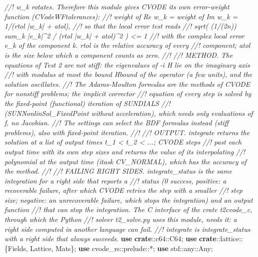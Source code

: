 \documentclass[
  10pt,
]{article}
\newenvironment{Shaded}{}{}
\newcommand{\BuiltInTok}[1]{\textcolor[rgb]{0.00,0.50,0.00}{#1}}
\newcommand{\CommentTok}[1]{\textcolor[rgb]{0.38,0.63,0.69}{\textit{#1}}}
\newcommand{\KeywordTok}[1]{\textcolor[rgb]{0.00,0.44,0.13}{\textbf{#1}}}
\newcommand{\NormalTok}[1]{#1}
\newcommand{\OperatorTok}[1]{\textcolor[rgb]{0.40,0.40,0.40}{#1}}
\newcommand{\PreprocessorTok}[1]{\textcolor[rgb]{0.74,0.48,0.00}{#1}}
\begin{document}
\begin{Shaded}
\begin{Highlighting}[]
\CommentTok{//! w\_k rotates.  Therefore this module gives CVODE its own error{-}weight function (CVodeWFtolerances):}
\CommentTok{//!     weight of Re w\_k = weight of Im w\_k = 1/(rtol |w\_k| + atol),}
\CommentTok{//! so that the local error test reads}
\CommentTok{//!     sqrt( (1/(2n)) sum\_k |e\_k|\^{}2 / (rtol |w\_k| + atol)\^{}2 ) \textless{}= 1}
\CommentTok{//! with the complex local error e\_k of the component k.  rtol is the relative accuracy of every}
\CommentTok{//! component; atol is the size below which a component counts as zero.}
\CommentTok{//!}
\CommentTok{//! METHOD.  The equations of Test 2 are not stiff: the eigenvalues of {-}i H lie on the imaginary axis}
\CommentTok{//! with modulus at most the bound Hbound of the operator (a few units), and the solution oscillates.}
\CommentTok{//! The Adams{-}Moulton formulas are the methods of CVODE for nonstiff problems; the implicit corrector}
\CommentTok{//! equation of every step is solved by the fixed{-}point (functional) iteration of SUNDIALS}
\CommentTok{//! (SUNNonlinSol\_FixedPoint without acceleration), which needs only evaluations of f, no Jacobian.}
\CommentTok{//! The settings can select the BDF formulas instead (stiff problems), also with fixed{-}point iteration.}
\CommentTok{//!}
\CommentTok{//! OUTPUT.  \textasciigrave{}integrate\textasciigrave{} returns the solution at a list of output times t\_1 \textless{} t\_2 \textless{} ...; CVODE steps}
\CommentTok{//! past each output time with its own step sizes and returns the value of its interpolating}
\CommentTok{//! polynomial at the output time (itask CV\_NORMAL), which has the accuracy of the method.}
\CommentTok{//!}
\CommentTok{//! FAILING RIGHT SIDES.  \textasciigrave{}integrate\_status\textasciigrave{} is the same integration for a right side that reports a}
\CommentTok{//! status (0 success, positive: a recoverable failure, after which CVODE retries the step with a smaller}
\CommentTok{//! step size; negative: an unrecoverable failure, which stops the integration) and an output function}
\CommentTok{//! that can stop the integration.  The C interface of the crate t2cvode\_c, through which the Python}
\CommentTok{//! solver t2\_solve.py uses this module, needs it: a right side computed in another language can fail.}
\CommentTok{//! \textasciigrave{}integrate\textasciigrave{} is \textasciigrave{}integrate\_status\textasciigrave{} with a right side that always succeeds.}
\KeywordTok{use} \KeywordTok{crate}\PreprocessorTok{::c64::}\NormalTok{C64}\OperatorTok{;}
\KeywordTok{use} \KeywordTok{crate}\PreprocessorTok{::lattice::}\OperatorTok{\{}\NormalTok{Fields}\OperatorTok{,}\NormalTok{ Lattice}\OperatorTok{,}\NormalTok{ Mats}\OperatorTok{\};}
\KeywordTok{use} \PreprocessorTok{cvode\_rs::prelude::}\OperatorTok{*;}
\KeywordTok{use} \PreprocessorTok{std::any::}\BuiltInTok{Any}\OperatorTok{;}


\end{Highlighting}
\end{Shaded}
\end{document}
